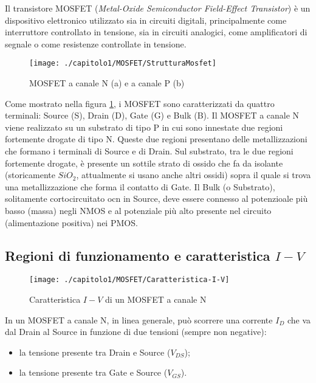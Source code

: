 Il transistore MOSFET (\emph{Metal-Oxide Semiconductor Field-Effect Transistor}) è un dispositivo elettronico utilizzato sia in circuiti digitali, principalmente come interruttore controllato in tensione, sia in circuiti analogici, come amplificatori di segnale o come resistenze controllate in tensione.\\

\begin{figure}[H]
  \centering
  \texttt{[image: ./capitolo1/MOSFET/StrutturaMosfet]}
  \caption[Struttura dei MOSFET]{MOSFET a canale N (a) e a canale P (b) \cite{transistore_MOSFET:From_MOSFET_to_FinFET_to_GAAFET}}
  \label{fig:StrutturaMosfet}
\end{figure}

Come mostrato nella figura \ref{fig:StrutturaMosfet}, i MOSFET sono caratterizzati da quattro terminali: Source (S), Drain (D), Gate (G) e Bulk (B).
Il MOSFET a canale N viene realizzato su un substrato di tipo P in cui sono innestate due regioni fortemente drogate di tipo N. Queste due regioni presentano delle metallizzazioni che formano i terminali di Source e di Drain. Sul substrato, tra le due regioni fortemente drogate, è presente un sottile strato di ossido che fa da isolante (storicamente $SiO_2$, attualmente si usano anche altri ossidi) sopra il quale si trova una metallizzazione che forma il contatto di Gate. Il Bulk (o Substrato), solitamente cortocircuitato ocn in Source, deve essere connesso al potenzioale più basso (massa) negli NMOS e al potenziale più alto presente nel circuito (alimentazione positiva) nei PMOS. \\

\subsection{Regioni di funzionamento e caratteristica $I-V$}

\begin{figure}[H]
  \centering
  \texttt{[image: ./capitolo1/MOSFET/Caratteristica-I-V]}
  \caption[Caratteristica $I-V$ di un MOSFET a canale N]{Caratteristica $I-V$ di un MOSFET a canale N}
  \label{fig:caratteristica-I-V}
\end{figure}

In un MOSFET a canale N, in linea generale, può scorrere una corrente $I_D$ che va dal Drain al Source in funzione di due tensioni (sempre non negative): 
\begin{itemize}
  \item la tensione presente tra Drain e Source ($V_{DS}$);
  \item la tensione presente tra Gate e Source ($V_{GS}$).  
\end{itemize}

